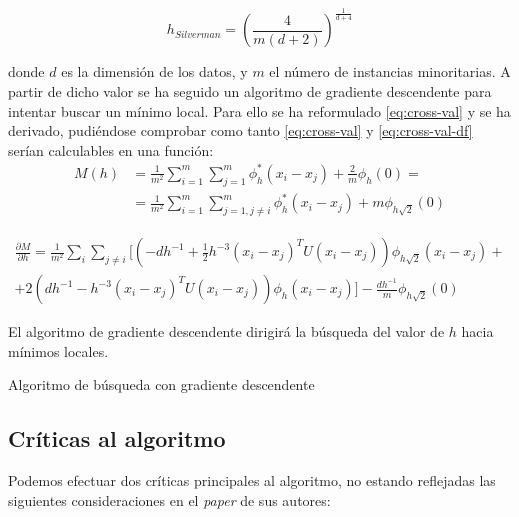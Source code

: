 \[h_{Silverman} = \left(\frac{4}{m(d+2)}\right)^{\frac{1}{d+4}}\]

donde $d$ es la dimensión de los datos, y $m$ el número de instancias minoritarias. A partir de dicho valor se ha seguido un
algoritmo de gradiente descendente para intentar buscar un mínimo local. Para ello se ha reformulado \ref{eq:cross-val} y
se ha derivado, pudiéndose comprobar como tanto \ref{eq:cross-val} y \ref{eq:cross-val-df} serían calculables en una función:
\begin{align*}
M(h) &= \frac{1}{m^2} \sum_{i=1}^m \sum_{j=1}^m \phi_h^{\ast} (x_i - x_j) + \frac{2}{m} \phi_h(0) = \\
     &= \frac{1}{m^2} \sum_{i=1}^m \sum_{j=1, j\neq i}^m \phi_h^{\ast} (x_i - x_j) + m \phi_{h\sqrt{2}}(0)
\end{align*}

\begin{align}
\frac{\partial M}{\partial h} = \frac{1}{m^2} \sum_{i} \sum_{j\neq i} \bigg[\left(-d h^{-1} + 
  \frac{1}{2} h^{-3} (x_i-x_j)^T U (x_i-x_j) \right) \phi_{h\sqrt{2}}(x_i-x_j) + \nonumber \\ 
  + 2 \left(d h^{-1} - h^{-3}(x_i-x_j)^T U (x_i-x_j) \right) \phi_{h}(x_i-x_j)\bigg] - \frac{dh^{-1}}{m} \phi_{h\sqrt{2}}(0)
 \label{eq:cross-val-df}
\end{align}

El algoritmo de gradiente descendente dirigirá la búsqueda del valor de $h$ hacia mínimos locales.

\begin{algorithm}[H]
\begin{algorithmic}[1]
  \NEWLINE
    \ENDIF
  \ENDWHILE
\end{algorithmic}
\caption{Algoritmo de búsqueda con gradiente descendente}
\end{algorithm}



\subsection{Críticas al algoritmo}
Podemos efectuar dos críticas principales al algoritmo, no estando reflejadas las siguientes consideraciones en el \textit{paper}
de sus autores:

